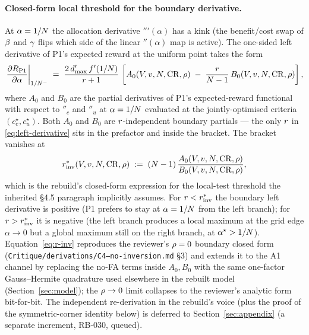 \paragraph{Closed-form local threshold for the boundary derivative.}
At $\alpha = 1/N$ the allocation derivative $\dprime'(\alpha)$
has a kink (the benefit/cost swap of $\beta$ and $\gamma$ flips
which side of the linear $\dprime(\alpha)$ map is active). The
one-sided left derivative of P1's expected reward at the uniform
point takes the form
%
\begin{equation}
  \left. \frac{\partial R_{\mathrm{P1}}}{\partial \alpha} \right|_{1/N^-}
  \;=\;
  \frac{2\, d'_{\max}\, f'(1/N)}{r + 1}\,
  \left[
    A_0(V, v, N, \mathrm{CR}, \rho)
    \;-\;
    \frac{r}{N - 1}\, B_0(V, v, N, \mathrm{CR}, \rho)
  \right],
  \label{eq:left-derivative}
\end{equation}
%
where $A_0$ and $B_0$ are the partial derivatives of P1's
expected-reward functional with respect to $\dprime_c$ and
$\dprime_u$ at $\alpha = 1/N$ evaluated at the jointly-optimised
criteria $(c_c^\star, c_u^\star)$. Both $A_0$ and $B_0$ are
$r$-independent boundary partials --- the only $r$ in
\eqref{eq:left-derivative} sits in the prefactor and inside the
bracket. The bracket vanishes at
%
\begin{equation}
  r^{*}_{\mathrm{inv}}(V, v, N, \mathrm{CR}, \rho)
  \;:=\;
  (N - 1)\,
  \frac{A_0(V, v, N, \mathrm{CR}, \rho)}
       {B_0(V, v, N, \mathrm{CR}, \rho)},
  \label{eq:r-inv}
\end{equation}
%
which is the rebuild's closed-form expression for the local-test
threshold the inherited §4.5 paragraph implicitly assumes. For
$r < r^{*}_{\mathrm{inv}}$ the boundary left derivative is positive (P1
prefers to stay at $\alpha = 1/N$ from the left branch); for
$r > r^{*}_{\mathrm{inv}}$ it is negative (the left branch produces a
local maximum at the grid edge $\alpha \to 0$ but a global maximum
still on the right branch, at $\alpha^\star > 1/N$).
Equation~\eqref{eq:r-inv} reproduces the reviewer's $\rho = 0$
boundary closed form
(\texttt{Critique/derivations/C4--no-inversion.md} §3) and extends
it to the A1 channel by replacing the no-FA terms inside
$A_0, B_0$ with the same one-factor Gauss--Hermite quadrature used
elsewhere in the rebuilt model (Section~\ref{sec:model}); the
$\rho \to 0$ limit collapses to the reviewer's analytic form
bit-for-bit. The independent re-derivation in the rebuild's voice
(plus the proof of the symmetric-corner identity below) is deferred
to Section~\ref{sec:appendix} (a separate increment, RB-030,
queued).

